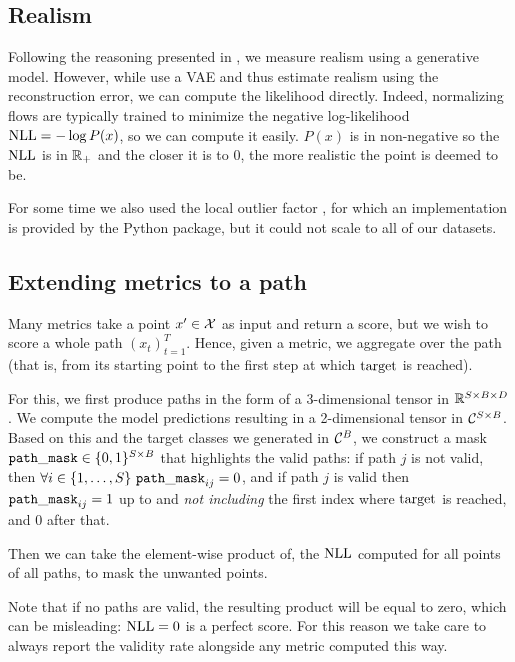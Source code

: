 \documentclass[../main.tex]{subfiles}
\begin{document}
\subsection{Realism}

Following the reasoning presented in \cite{vanlooverenInterpretable2021}, we measure realism using a generative model.
However, while \citeauthor{vanlooverenInterpretable2021} use a VAE and thus estimate realism using the reconstruction error, we can compute the likelihood directly.
Indeed, normalizing flows are typically trained to minimize the negative log-likelihood $\text{NLL} = - \log P(x)$, so we can compute it easily.
$P(x)$ is in non-negative so the $\text{NLL}$ is in $\mathbb{R}_+$ and the closer it is to 0, the more realistic the point is deemed to be.

For some time we also used the local outlier factor \cite{breunigLOF2000}, for which an implementation is provided by the \sklearn{} Python package, but it could not scale to all of our datasets.

\subsection{Extending metrics to a path}

Many metrics take a point $x' \in \mathcal{X}$ as input and return a score, but we wish to score a whole path $(x_t)_{t=1}^T$.
Hence, given a metric, we aggregate over the path (that is, from its starting point to the first step at which $\mathrm{target}$ is reached).

For this, we first produce paths in the form of a 3-dimensional tensor in $\mathbb{R}^{S \times B \times D}$.
We compute the model predictions resulting in a 2-dimensional tensor in $\mathcal{C}^{S \times B}$.
Based on this and the target classes we generated in $\mathcal{C}^B$, we construct a mask $\mathtt{path\_mask} \in \{0, 1\}^{S \times B}$ that highlights the valid paths:
if path $j$ is not valid, then
$\forall i \in \{1, \ldots, S\}\ \mathtt{path\_mask}_{ij} = 0$, and if path $j$ is valid then $\mathtt{path\_mask}_{ij} = 1$ up to and \emph{not including} the first index where $\mathrm{target}$ is reached, and 0 after that.

Then we can take the element-wise product of, \eg{} the $\text{NLL}$ computed for all points of all paths, to mask the unwanted points.

Note that if no paths are valid, the resulting product will be equal to zero, which can be misleading: $\text{NLL} = 0$ is a perfect score.
For this reason we take care to always report the validity rate alongside any metric computed this way.
\end{document}
